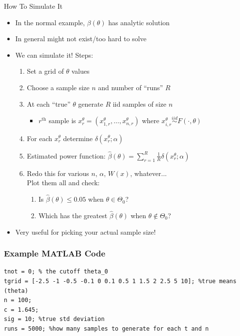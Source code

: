 \begin{frame}{How To Simulate It}
    \begin{itemize}
        \item In the normal example, $\beta(\theta)$ has analytic solution
        \item In general might not exist/too hard to solve
        \item We can simulate it! Steps:
        \begin{enumerate}
            \item Set a grid of $\theta$ values
            \item Choose a sample size $n$ and number of ``runs'' $R$
            \item At each ``true'' $\theta$ generate $R$ iid samples of size $n$
            \begin{itemize}
                \item $r^\text{th}$ sample is $x_r^\theta=(x_{1,r}^\theta,\ldots,x_{n,r}^\theta)$ where $x_{i,r}^\theta\overset{iid}{\sim}F(\cdot,\theta)$
            \end{itemize}
            \item For each $x_r^\theta$ determine $\delta(x_r^\theta;\alpha)$
            \item Estimated power function: $\hat{\beta}(\theta)=\sum_{r=1}^R\frac{1}{R}\delta(x_r^\theta;\alpha)$
            \item Redo this for various $n$, $\alpha$, $W(x)$, whatever...\\
            Plot them all and check:
            \begin{enumerate}
                \item Is $\hat{\beta}(\theta)\leq 0.05$ when $\theta\in\Theta_0$?
                \item Which has the greatest $\hat{\beta}(\theta)$ when $\theta\not\in\Theta_0$?            
            \end{enumerate}
        \end{enumerate}
        \item Very useful for picking your actual sample size!
    \end{itemize}
\end{frame}

\begin{frame}[fragile]
    \frametitle{Example MATLAB Code}
    \begin{lstlisting}[title={Part 1: Setting Parameters}]
%% Set parameters
tnot = 0; % the cutoff theta_0
tgrid = [-2.5 -1 -0.5 -0.1 0 0.1 0.5 1 1.5 2 2.5 5 10]; %true means (theta)
n = 100;
c = 1.645;
sig = 10; %true std deviation
runs = 5000; %how many samples to generate for each t and n
    \end{lstlisting}
\end{frame}


